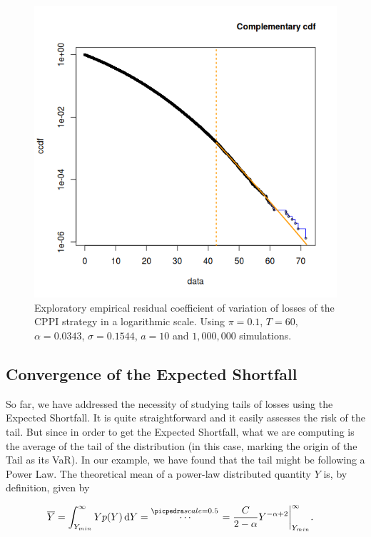\begin{figure}[h]
    \centering
    \includegraphics[scale=0.75]{images/cppi-ccdf-autothresh.png}
    \caption{Exploratory empirical residual coefficient of variation of losses of the CPPI strategy in a logarithmic scale. Using $\pi = 0.1$, $T=60$, $\alpha = 0.0343$, $\sigma = 0.1544$, $a=10$ and $1,000,000$ simulations.}
    \label{fig:cppi-ccdf-autothresh}
\end{figure}

\subsection{Convergence of the Expected Shortfall}

So far, we have addressed the necessity of studying tails of losses using the Expected Shortfall. It is quite straightforward and it easily assesses the risk of the tail. But since in order to get the Expected Shortfall, what we are computing is the average of the tail of the distribution (in this case, marking the origin of the Tail as its VaR). In our example, we have found that the tail might be following a Power Law. The theoretical mean of a power-law distributed quantity $Y$ is, by definition, given by

\begin{align}\label{eq:power-law-div}
\begin{split}
    \overline{Y} &= \int_{Y_{min}}^{\infty}Yp(Y)\dd{Y} =
    \pedra
    = \frac{C}{2 - \alpha}Y^{-\alpha + 2}\biggr\rvert_{Y_{min}}^{\infty} \emph{.}
\end{split}
\end{align}

